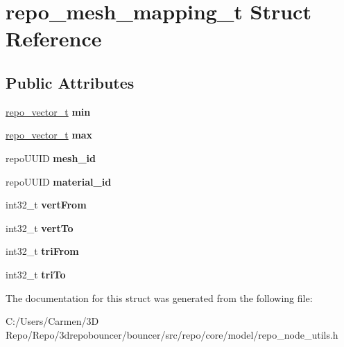 \hypertarget{structrepo__mesh__mapping__t}{}\section{repo\+\_\+mesh\+\_\+mapping\+\_\+t Struct Reference}
\label{structrepo__mesh__mapping__t}
\subsection*{Public Attributes}
\begin{DoxyCompactItemize}
\item 
\hypertarget{structrepo__mesh__mapping__t_a64c13a942cb509903088fe5f3255bba9}{}\hyperlink{structrepo__vector__t}{repo\+\_\+vector\+\_\+t} {\bfseries min}\label{structrepo__mesh__mapping__t_a64c13a942cb509903088fe5f3255bba9}

\item 
\hypertarget{structrepo__mesh__mapping__t_a5dd76d8702119d7e1cbc635578381bb8}{}\hyperlink{structrepo__vector__t}{repo\+\_\+vector\+\_\+t} {\bfseries max}\label{structrepo__mesh__mapping__t_a5dd76d8702119d7e1cbc635578381bb8}

\item 
\hypertarget{structrepo__mesh__mapping__t_a3a91bd07456a32a1777a8bc7f493912d}{}repo\+U\+U\+I\+D {\bfseries mesh\+\_\+id}\label{structrepo__mesh__mapping__t_a3a91bd07456a32a1777a8bc7f493912d}

\item 
\hypertarget{structrepo__mesh__mapping__t_affa918b8fd09578de7044f51fe1812bc}{}repo\+U\+U\+I\+D {\bfseries material\+\_\+id}\label{structrepo__mesh__mapping__t_affa918b8fd09578de7044f51fe1812bc}

\item 
\hypertarget{structrepo__mesh__mapping__t_abe6446a1ba73e81296bf1be3dfcb27fd}{}int32\+\_\+t {\bfseries vert\+From}\label{structrepo__mesh__mapping__t_abe6446a1ba73e81296bf1be3dfcb27fd}

\item 
\hypertarget{structrepo__mesh__mapping__t_ac0adbd9a7d900cf83cb2406c47ea9291}{}int32\+\_\+t {\bfseries vert\+To}\label{structrepo__mesh__mapping__t_ac0adbd9a7d900cf83cb2406c47ea9291}

\item 
\hypertarget{structrepo__mesh__mapping__t_a878d2ef1b43afb1deaa0e8130bf5bc81}{}int32\+\_\+t {\bfseries tri\+From}\label{structrepo__mesh__mapping__t_a878d2ef1b43afb1deaa0e8130bf5bc81}

\item 
\hypertarget{structrepo__mesh__mapping__t_ab5dc942ac42234ba663c45da65f1f361}{}int32\+\_\+t {\bfseries tri\+To}\label{structrepo__mesh__mapping__t_ab5dc942ac42234ba663c45da65f1f361}

\end{DoxyCompactItemize}


The documentation for this struct was generated from the following file\+:\begin{DoxyCompactItemize}
\item 
C\+:/\+Users/\+Carmen/3\+D Repo/\+Repo/3drepobouncer/bouncer/src/repo/core/model/repo\+\_\+node\+\_\+utils.\+h\end{DoxyCompactItemize}
